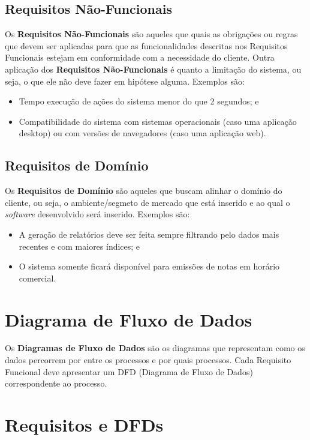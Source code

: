\documentclass[a4paper,12pt]{article}
\begin{document}
\subsection{Requisitos Não-Funcionais}
Os \textbf{Requisitos Não-Funcionais} são aqueles que quais as obrigações ou regras que devem ser aplicadas para que as funcionalidades descritas nos Requisitos Funcionais estejam em conformidade com a necessidade do cliente.
Outra aplicação dos \textbf{Requisitos Não-Funcionais} é quanto a limitação do sistema, ou seja, o que ele não deve fazer em hipótese alguma. Exemplos são:
\begin{itemize}
	\item Tempo execução de ações do sistema menor do que 2 segundos; e
	\item Compatibilidade do sistema com sistemas operacionais (caso uma aplicação desktop) ou com versões de navegadores (caso uma aplicação web).
\end{itemize}


\subsection{Requisitos de Domínio}
Os \textbf{Requisitos de Domínio} são aqueles que buscam alinhar o domínio do cliente, ou seja, o ambiente/segmeto de mercado que está inserido e ao qual o \textit{software} desenvolvido será inserido. Exemplos são:
\begin{itemize}
	\item A geração de relatórios deve ser feita sempre filtrando pelo dados mais recentes e com maiores índices; e
	\item O sistema somente ficará disponível para emissões de notas em horário comercial.
\end{itemize}

\section{Diagrama de Fluxo de Dados}
Os \textbf{Diagramas de Fluxo de Dados} são os diagramas que representam como os dados percorrem por entre os processos e por quais processos. Cada Requisito Funcional deve apresentar um DFD (Diagrama de Fluxo de Dados) correspondente ao processo.

\section{Requisitos e DFDs}
\end{document}
